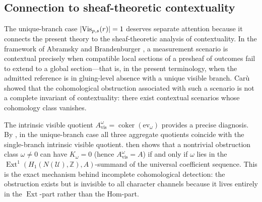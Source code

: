 \subsection{Connection to sheaf-theoretic contextuality}

The unique-branch case $|\mathrm{Vis}_{p,s}(r)|=1$ deserves separate attention because it connects the present theory to the sheaf-theoretic analysis of contextuality. In the framework of Abramsky and Brandenburger \cite{AbramskyBrandenburger2011}, a measurement scenario is contextual precisely when compatible local sections of a presheaf of outcomes fail to extend to a global section---that is, in the present terminology, when the admitted reference is in gluing-level absence with a unique visible branch. Car\`u \cite{Caru2017} showed that the cohomological obstruction associated with such a scenario is not a complete invariant of contextuality: there exist contextual scenarios whose cohomology class vanishes.

The intrinsic visible quotient $A_{\mathrm{vis}}^{\omega}=\operatorname{coker}(\mathrm{ev}_{\omega})$ provides a precise diagnosis. By , in the unique-branch case all three aggregate quotients coincide with the single-branch intrinsic visible quotient.  then shows that a nontrivial obstruction class $\omega\neq 0$ can have $K_{\omega}=0$ (hence $A_{\mathrm{vis}}^{\omega}=A$) if and only if $\omega$ lies in the $\operatorname{Ext}^1(H_1(N(\mathcal U),\mathbb Z),A)$-summand of the universal coefficient sequence. This is the exact mechanism behind incomplete cohomological detection: the obstruction exists but is invisible to all character channels because it lives entirely in the $\operatorname{Ext}$-part rather than the $\mathrm{Hom}$-part.
